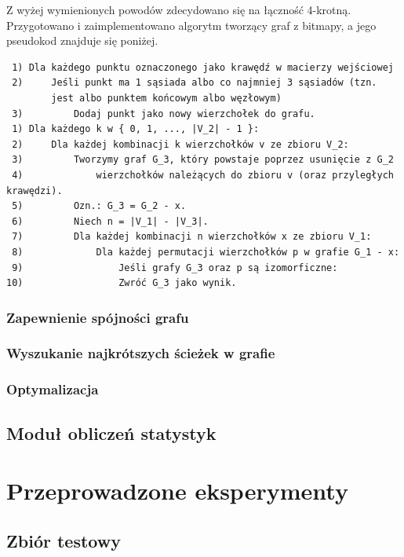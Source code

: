 \documentclass[a4paper,11pt,twoside]{report}
\theoremstyle{definition}
\begin{document}
\bigskip

Z wyżej wymienionych powodów zdecydowano się na łączność 4-krotną. Przygotowano i zaimplementowano algorytm tworzący graf z bitmapy, a jego pseudokod znajduje się poniżej. %

\begin{verbatim}
 1) Dla każdego punktu oznaczonego jako krawędź w macierzy wejściowej
 2)     Jeśli punkt ma 1 sąsiada albo co najmniej 3 sąsiadów (tzn.
        jest albo punktem końcowym albo węzłowym)
 3)         Dodaj punkt jako nowy wierzchołek do grafu. 
 1) Dla każdego k w { 0, 1, ..., |V_2| - 1 }:
 2)     Dla każdej kombinacji k wierzchołków v ze zbioru V_2:
 3)         Tworzymy graf G_3, który powstaje poprzez usunięcie z G_2
 4)             wierzchołków należących do zbioru v (oraz przyległych krawędzi).
 5)         Ozn.: G_3 = G_2 - x.
 6)         Niech n = |V_1| - |V_3|.
 7)         Dla każdej kombinacji n wierzchołków x ze zbioru V_1:
 8)             Dla każdej permutacji wierzchołków p w grafie G_1 - x:
 9)                 Jeśli grafy G_3 oraz p są izomorficzne:
10)                 Zwróć G_3 jako wynik.
\end{verbatim}

\subsection {Zapewnienie spójności grafu}

\subsection {Wyszukanie najkrótszych ścieżek w grafie}

\subsection {Optymalizacja}

\section {Moduł obliczeń statystyk}

\chapter {Przeprowadzone eksperymenty}

\section {Zbiór testowy}
\end{document}
